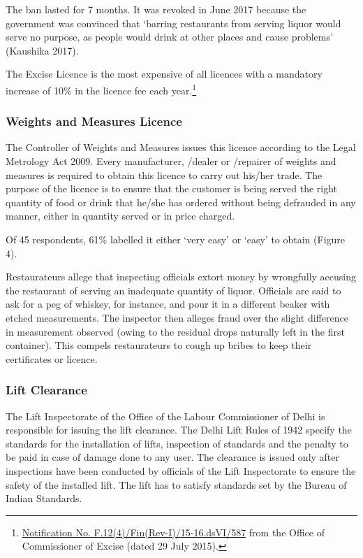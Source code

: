\documentclass[a4paper, 12pt]{article}
\begin{document}
		The ban lasted for 7 months. It was revoked in June 2017 because the government was convinced that ‘barring restaurants from serving liquor would serve no purpose, as people would drink at other places and cause problems’ (Kaushika 2017).
		
		The Excise Licence is the most expensive of all licences with a mandatory increase of 10\% in the licence fee each year.\footnote{\href{https://bit.ly/2xoejoG}{Notification No. F.12(4)/Fin(Rev-I)/15-16.dsVI/587} from the Office of Commissioner of Excise 
(dated 29 July 2015).} %
		
		
		\subsubsection{Weights and Measures Licence}
		The Controller of Weights and Measures issues this licence according to the Legal Metrology Act 2009. Every manufacturer, /dealer or /repairer of weights and measures is required to obtain this licence to carry out his/her trade. The purpose of the 
licence is to ensure that the customer is being served the right quantity of food or drink that he/she has ordered without being defrauded in any manner, either in quantity served or in price charged.
		
		Of 45 respondents, 61\% labelled it either ‘very easy’ or ‘easy’ to obtain (Figure 4). %
		
		Restaurateurs allege that inspecting officials extort money by wrongfully accusing the restaurant of serving an inadequate quantity of liquor. Officials are said to ask for a peg of whiskey, for instance, and pour it in a different beaker with etched 
measurements. The inspector then alleges fraud over the slight difference in measurement observed (owing to the residual drops naturally left in the first container). This compels restaurateurs to cough up bribes to keep their certificates or licence.
		
	
	
		\subsubsection{Lift Clearance}
		The Lift Inspectorate of the Office of the Labour Commissioner of Delhi is responsible for issuing the lift clearance. The Delhi Lift Rules of 1942 specify the standards for the installation of lifts, inspection of standards and the penalty to be paid in case of 
damage done to any user. The clearance is issued only after inspections have been conducted by officials of the Lift Inspectorate to ensure the safety of the installed lift. The lift has to satisfy standards set by the Bureau of Indian Standards.
		
\end{document}
